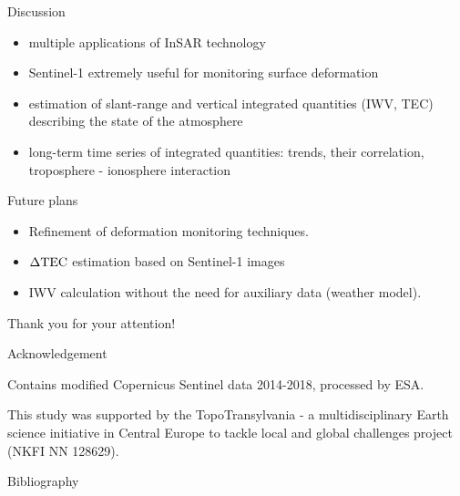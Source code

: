 \documentclass{beamer}
\begin{document}
\begin{frame}{}

    {\Large \fcol Discussion}
    
    \begin{itemize}
        \item multiple applications of InSAR technology
        \item Sentinel-1 extremely useful for monitoring surface deformation
        \item estimation of slant-range and vertical integrated quantities (IWV, TEC) describing the state of the atmosphere
        \item long-term time series of integrated quantities: trends, their correlation, troposphere - ionosphere interaction
    \end{itemize}
    
    \vspace{10pt}
    
    {\Large \fcol Future plans}
    
    \begin{itemize}
        \item Refinement of deformation monitoring techniques.
        \item $\Delta\mathrm{TEC}$ estimation based on Sentinel-1 images
        \item IWV calculation without the need for auxiliary data (weather model).
    \end{itemize}
\end{frame}


\begin{frame}
    \begin{center}
        \Huge \fcol
        Thank you for your attention!
    \end{center}
    \vspace{25pt}
    
    \begin{center}
        \Large \fcol \center Acknowledgement
    \end{center}
    \vspace{10pt}
    
    Contains modified Copernicus Sentinel data 2014-2018, processed by ESA.
    \vspace{5pt}
    
    This study was supported by the TopoTransylvania - a multidisciplinary Earth science initiative in Central Europe to tackle local and global challenges project (NKFI NN 128629).
\end{frame}


\begin{frame}[allowframebreaks]{Bibliography}
    \tiny
    
\end{frame}
\end{document}
